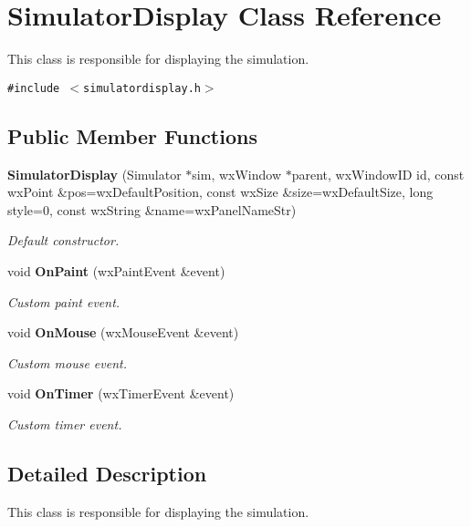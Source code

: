 \section{Simulator\-Display Class Reference}
\label{classSimulatorDisplay}
This class is responsible for displaying the simulation.  


{\tt \#include $<$simulatordisplay.h$>$}

\subsection*{Public Member Functions}
\begin{CompactItemize}
\item 
{\bf Simulator\-Display} (Simulator $\ast$sim, wx\-Window $\ast$parent, wx\-Window\-ID id, const wx\-Point \&pos=wx\-Default\-Position, const wx\-Size \&size=wx\-Default\-Size, long style=0, const wx\-String \&name=wx\-Panel\-Name\-Str)
\begin{CompactList}\small\item\em Default constructor. \item\end{CompactList}\item 
void {\bf On\-Paint} (wx\-Paint\-Event \&event)
\begin{CompactList}\small\item\em Custom paint event. \item\end{CompactList}\item 
void {\bf On\-Mouse} (wx\-Mouse\-Event \&event)
\begin{CompactList}\small\item\em Custom mouse event. \item\end{CompactList}\item 
void {\bf On\-Timer} (wx\-Timer\-Event \&event)
\begin{CompactList}\small\item\em Custom timer event. \item\end{CompactList}\end{CompactItemize}


\subsection{Detailed Description}
This class is responsible for displaying the simulation. 



